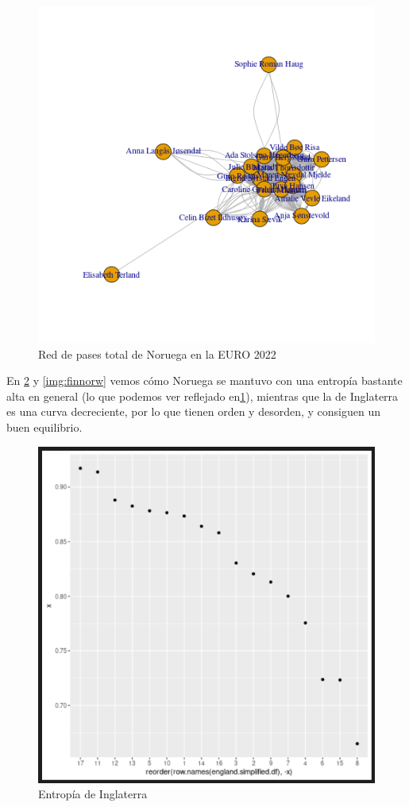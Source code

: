 \begin{figure}[ht!]
    \centering
     \includegraphics[width=\textwidth]{./img/plot_norw.png}
     \caption{Red de pases total de Noruega en la EURO 2022}
     \label{img:ent:norw}
\end{figure}

En \ref{img:fineng} y \ref{img:finnorw} vemos cómo Noruega se mantuvo con una entropía bastante alta en general
(lo que podemos ver reflejado en\ref{img:ent:norw}), 
mientras que la de Inglaterra es una curva decreciente, por lo que tienen orden y desorden, y consiguen un buen 
equilibrio.

\begin{figure}[ht!]
    \centering
     \includegraphics[width=\textwidth]{./img/englandentropy.png}
     \caption{Entropía de Inglaterra}
     \label{img:fineng}
\end{figure}

